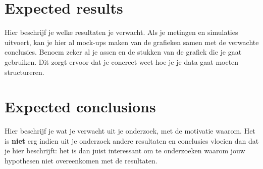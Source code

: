 \documentclass[fleqn,10pt]{voorstel}
\begin{document}


\section{Expected results}
\label{sec:expected_results}

Hier beschrijf je welke resultaten je verwacht. Als je metingen en simulaties uitvoert, kan je hier al mock-ups maken van de grafieken samen met de verwachte conclusies. Benoem zeker al je assen en de stukken van de grafiek die je gaat gebruiken. Dit zorgt ervoor dat je concreet weet hoe je je data gaat moeten structureren.


\section{Expected conclusions}
\label{sec:expected_conclusions}

Hier beschrijf je wat je verwacht uit je onderzoek, met de motivatie waarom. Het is \textbf{niet} erg indien uit je onderzoek andere resultaten en conclusies vloeien dan dat je hier beschrijft: het is dan juist interessant om te onderzoeken waarom jouw hypothesen niet overeenkomen met de resultaten.


\printbibliography[heading=bibintoc]
\end{document}

